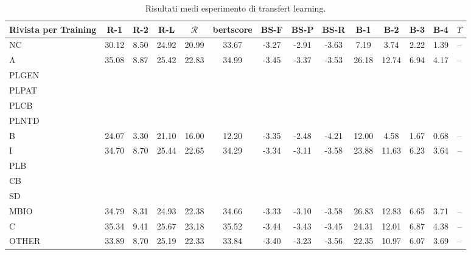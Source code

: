 \documentclass[12pt,a4paper,twoside,openright]{book}
\begin{document}
\begin{table}
\centering
\begin{adjustbox}{width=\textwidth,center}
\begin{tabular}{@{}lccccccccccccc@{}}
\toprule
\textbf{Rivista per Training} & \textbf{R-1} & \textbf{R-2} & \textbf{R-L} & \textbf{\(\mathcal{R}\)} & \textbf{bertscore} & \textbf{BS-F} & \textbf{BS-P} & \textbf{BS-R} & \textbf{B-1} & \textbf{B-2} & \textbf{B-3} & \textbf{B-4} & \textbf{\(\Upsilon\)} \\
\midrule
\rowcolor[rgb]{0.965,0.965,0.965}NC & 30.12 & 8.50 & 24.92 & 20.99 & 33.67 & -3.27 & -2.91 & -3.63 & 7.19 & 3.74 & 2.22 & 1.39 & -- \\
A & 35.08 & 8.87 & 25.42 & 22.83 & 34.99 & -3.45 & -3.37 & -3.53 & 26.18 & 12.74 & 6.94 & 4.17 & -- \\
\rowcolor[rgb]{0.965,0.965,0.965}PLGEN & & & & & & & & & & & & & \\
PLPAT & & & & & & & & & & & & & \\
\rowcolor[rgb]{0.965,0.965,0.965}PLCB & & & & & & & & & & & & & \\
PLNTD & & & & & & & & & & & & & \\
\rowcolor[rgb]{0.965,0.965,0.965}B & 24.07 & 3.30 & 21.10 & 16.00 & 12.20 & -3.35 & -2.48 & -4.21 & 12.00 & 4.58 & 1.67 & 0.68 & -- \\
I & 34.70 & 8.70 & 25.44 & 22.65 & 34.29 & -3.34 & -3.11 & -3.58 & 23.88 & 11.63 & 6.23 & 3.64 & -- \\
\rowcolor[rgb]{0.965,0.965,0.965}PLB & & & & & & & & & & & & & \\
CB & & & & & & & & & & & & & \\
\rowcolor[rgb]{0.965,0.965,0.965}SD & & & & & & & & & & & & & \\
MBIO & 34.79 & 8.31 & 24.93 & 22.38 & 34.66 & -3.33 & -3.10 & -3.58 & 26.83 & 12.83 & 6.65 & 3.71 & -- \\
\rowcolor[rgb]{0.965,0.965,0.965}C & 35.34 & 9.41 & 25.67 & 23.18 & 35.52 & -3.44 & -3.43 & -3.45 & 24.31 & 12.01 & 6.87 & 4.38 & -- \\
OTHER & 33.89 & 8.70 & 25.19 & 22.33 & 33.84 & -3.40 & -3.23 & -3.56 & 22.35 & 10.97 & 6.07 & 3.69 & -- \\
\bottomrule
\end{tabular}
\end{adjustbox}
\caption{Risultati medi esperimento di transfert learning.}
\label{tab:tf-results}
\end{table}
\end{document}
